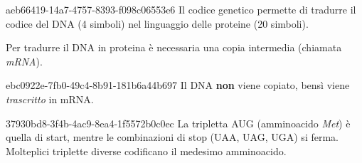 \documentclass[preview]{standalone}
\begin{document}
\begin{snippet}{aeb66419-14a7-4757-8393-f098c06553e6}
    Il codice genetico permette di tradurre il codice del DNA
    (4 simboli) nel linguaggio delle proteine (20 simboli).


    Per tradurre il DNA in proteina è necessaria una copia intermedia
    (chiamata \textit{mRNA}).
\end{snippet}

\begin{snippetnote}{ebc0922e-7fb0-49c4-8b91-181b6a44b697}{}
    Il DNA \textbf{non} viene copiato, bensì viene
    \textit{trascritto} in mRNA.
\end{snippetnote}

\begin{snippet}{37930bd8-3f4b-4ac9-8ea4-1f5572b0c0ec}
    La tripletta AUG (amminoacido \textit{Met}) è quella di start,
    mentre le combinazioni di stop (UAA, UAG, UGA) si ferma.
    Molteplici triplette diverse codificano il medesimo amminoacido.
\end{snippet}
\end{document}
